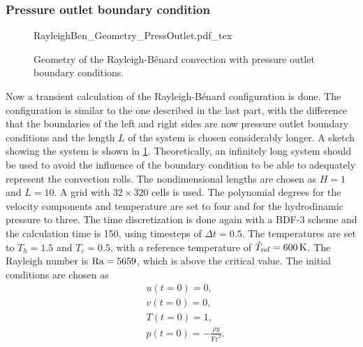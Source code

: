 \subsubsection{Pressure outlet boundary condition}\label{ssec:MultipleCellConv}
\begin{figure}[t!]
	\begin{center}
		\def\svgwidth{0.93\textwidth}
		{RayleighBen_Geometry_PressOutlet.pdf_tex}
		\caption{Geometry of the Rayleigh-Bénard convection with pressure outlet boundary conditions. }
		\label{fig:RayBenGeometry}
	\end{center}
\end{figure}
Now a transient calculation of the Rayleigh-Bénard configuration is done. The configuration is similar to the one described in the last part, with the difference that the boundaries of the left and right sides are now pressure outlet boundary conditions and the length $L$ of the system is chosen considerably longer. A sketch showing the system is shown in \cref{fig:RayBenGeometry}. Theoretically,  an infinitely long system should be used to avoid the influence of the boundary condition to be able to adequately represent the convection rolls. The nondimensional lengths are chosen as $H=1$ and $L=10$. A grid with $32\times320$ cells is used. The polynomial degrees for the velocity components and temperature are set to four and for the hydrodinamic pressure to three. The time discretization is done again with a BDF-3 scheme and the calculation time is 150, using timesteps of $\Delta t = 0.5$. The temperatures are set to $T_h = 1.5$ and $T_c = 0.5$, with a reference temperature of $\hat T_{\text{ref}} = \SI{600}{\kelvin}$. The Rayleigh number is $\text{Ra} = 5659$, which is above the critical value.
The initial conditions are chosen as
\begin{subequations} 
	\begin{align}
		&u(t=0) = 0, \\
		&v(t=0) = 0, \\
		&T(t=0) = 1, \\
		&p(t=0) = -\frac{\rho y}{\text{Fr}^2}.
	\end{align}
\end{subequations}

